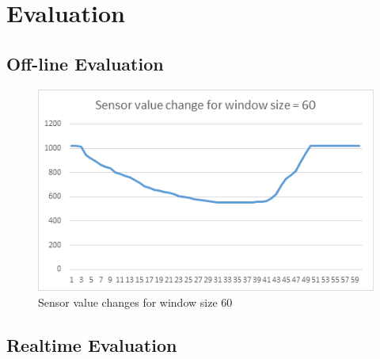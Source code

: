 \section{Evaluation}

\subsection{Off-line Evaluation}
\begin{figure}[h]
\includegraphics[width=.45\textwidth]{window_60.png}
\caption{Sensor value changes for window size 60}
\label{fig:window_60}
\end{figure}
\subsection{Realtime Evaluation}
